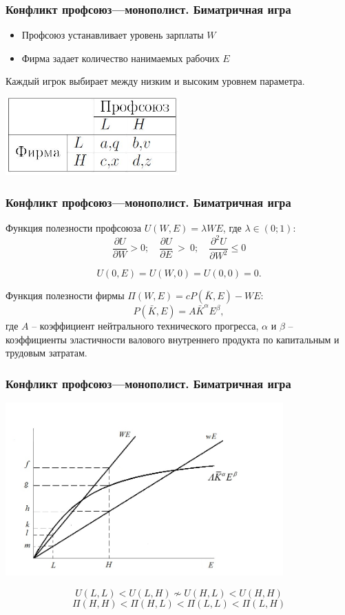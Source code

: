 \documentclass {beamer}
\begin{document}
\begin{frame}
	
\frametitle{Конфликт профсоюз---монополист. Биматричная игра}
	
\begin{itemize}
	\item Профсоюз устанавливает уровень зарплаты $W$
	\item Фирма задает количество нанимаемых рабочих $E$
\end{itemize}

Каждый игрок выбирает между низким и высоким уровнем параметра.
	\begin{center}
		\includegraphics[width=0.5\textwidth]{sixth}
	\end{center}
\end{frame}


\begin{frame}
	
\frametitle{Конфликт профсоюз---монополист. Биматричная игра}
	Функция полезности профсоюза  $U(W,E)=\lambda WE$, где $\lambda \in(0;1)$:
	$$
	\frac{\partial U}{\partial W} > 0; 
	\quad 
	\frac{\partial U}{\partial E}~>~0 ; 
	\quad
	\frac{\partial^2 U}{\partial W^2} \leqslant 0
	$$
	
	$$
	U(0,E) = U(W,0) = U(0,0) = 0.
	$$
	
	
	Функция полезности фирмы $\Pi(W,E)=cP(\bar{K},E)-WE$:
	$$P(\bar{K}, E)=A\bar{K}^\alpha E^\beta,$$  где $A$ – коэффициент нейтрального технического прогресса, $\alpha$ и $\beta$ – коэффициенты эластичности валового внутреннего продукта по капитальным и трудовым затратам.\\
\end{frame}

\begin{frame}
\frametitle{Конфликт профсоюз---монополист. Биматричная игра}
 \begin{center}
 	\includegraphics[width=0.8\textwidth]{monopoly_union2}
 \end{center}
		$$U(L,L) < U(L,H) \nsim U(H, L) < U(H,H)$$
		$$\Pi(H,H) < \Pi(H,L) < \Pi(L, L) < \Pi(L,H)
		 $$

\end{frame}
\end{document}
